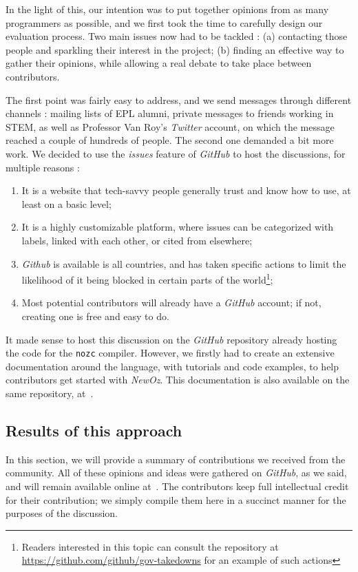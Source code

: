 In the light of this, our intention was to put together opinions from as many programmers as possible, and we first took the time to carefully design our evaluation process.
Two main issues now had to be tackled : (a) contacting those people and sparkling their interest in the project; (b) finding an effective way to gather their opinions, while allowing a real debate to take place between contributors.\newline

The first point was fairly easy to address, and we send messages through different channels : mailing lists of EPL alumni, private messages to friends working in STEM, as well as Professor Van Roy's \textit{Twitter} account, on which the message reached a couple of hundreds of people.\newline
The second one demanded a bit more work.
We decided to use the \textit{issues} feature of \textit{GitHub} to host the discussions, for multiple reasons :
\begin{enumerate}
    \item It is a website that tech-savvy people generally trust and know how to use, at least on a basic level;
    \item It is a highly customizable platform, where issues can be categorized with labels, linked with each other, or cited from elsewhere;
    \item \textit{Github} is available is all countries, and has taken specific actions to limit the likelihood of it being blocked in certain parts of the world\footnote{Readers interested in this topic can consult the repository at \url{https://github.com/github/gov-takedowns} for an example of such actions};
    \item Most potential contributors will already have a \textit{GitHub} account;
    if not, creating one is free and easy to do.
\end{enumerate}
It made sense to host this discussion on the \textit{GitHub} repository already hosting the code for the \texttt{nozc} compiler.
However, we firstly had to create an extensive documentation around the language, with tutorials and code examples, to help contributors get started with \textit{NewOz}.
This documentation is also available on the same repository, at~\cite{NozcGitHub}.

\subsection{Results of this approach}
In this section, we will provide a summary of contributions we received from the community.
All of these opinions and ideas were gathered on \textit{GitHub}, as we said, and will remain available online at~\cite{NozcGitHub}.
The contributors keep full intellectual credit for their contribution;
we simply compile them here in a succinct manner for the purposes of the discussion.\newline

